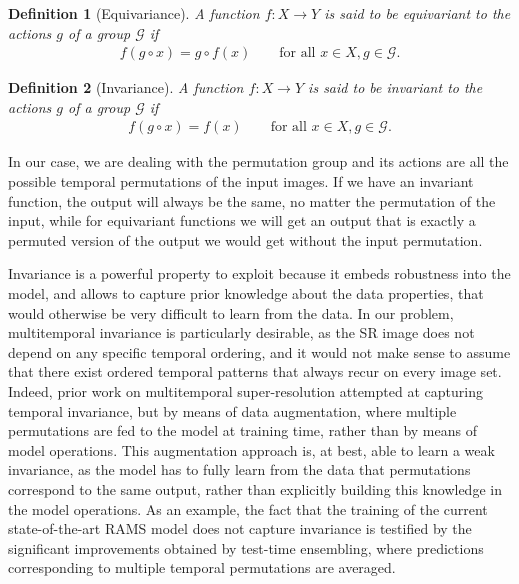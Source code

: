 \documentclass[journal]{IEEEtran}
\newtheorem{definition}{Definition}[section]
\begin{document}
\begin{definition}[Equivariance]
A function $f: X \rightarrow Y$ is said to be \textit{equivariant} to the actions $g$ of a group $\mathcal{G}$ if
\begin{align*}
    f(g \circ x) = g \circ f(x) \qquad \text{for all } x\in X, g \in \mathcal{G}.
\end{align*}
\end{definition} 

\begin{definition}[Invariance]
A function $f: X \rightarrow Y$ is said to be \textit{invariant} to the actions $g$ of a group $\mathcal{G}$ if
\begin{align*}
    f(g \circ x) = f(x) \qquad \text{for all } x\in X, g \in \mathcal{G}.
\end{align*}
\end{definition} 

In our case, we are dealing with the permutation group and its actions are all the possible temporal permutations of the input images. If we have an invariant function, the output will always be the same, no matter the permutation of the input, while for equivariant functions we will get an output that is exactly a permuted version of the output we would get without the input permutation. 

Invariance is a powerful property to exploit because it embeds robustness into the model, and allows to capture prior knowledge about the data properties, that would otherwise be very difficult to learn from the data. In our problem, multitemporal invariance is particularly desirable, as the SR image does not depend on any specific temporal ordering, and it would not make sense to assume that there exist ordered temporal patterns that always recur on every image set. Indeed, prior work on multitemporal super-resolution \cite{salvetti2020multi} attempted at capturing temporal invariance, but by means of data augmentation, where multiple permutations are fed to the model at training time, rather than by means of model operations. This augmentation approach is, at best, able to learn a weak invariance, as the model has to fully learn from the data that permutations correspond to the same output, rather than explicitly building this knowledge in the model operations. As an example, the fact that the training of the current state-of-the-art RAMS model \cite{salvetti2020multi} does not capture invariance is testified by the significant improvements obtained by test-time ensembling, where predictions corresponding to multiple temporal permutations are averaged.
\end{document}

